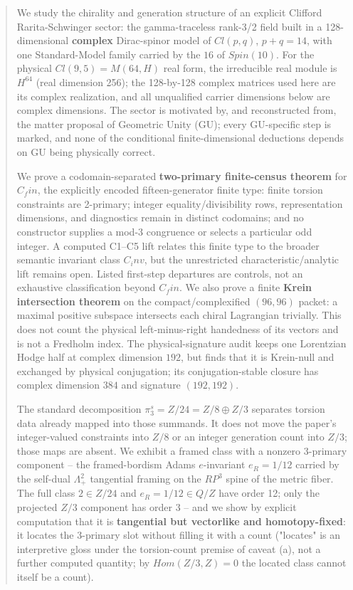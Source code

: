 \documentclass[11pt]{article}
\theoremstyle{remark}
\begin{document}
\begin{abstract}
We study the chirality and generation structure of an explicit Clifford Rarita-Schwinger sector: the gamma-traceless rank-3/2 field built in a 128-dimensional \textbf{complex} Dirac-spinor model of $Cl(p,q)$, $p+q = 14$, with one Standard-Model family carried by the $16$ of $Spin(10)$. For the physical $Cl(9,5) = M(64,H)$ real form, the irreducible real module is $H^64$ (real dimension 256); the 128-by-128 complex matrices used here are its complex realization, and all unqualified carrier dimensions below are complex dimensions. The sector is motivated by, and reconstructed from, the matter proposal of Geometric Unity (GU); every GU-specific step is marked, and none of the conditional finite-dimensional deductions depends on GU being physically correct.

We prove a codomain-separated \textbf{two-primary finite-census theorem} for $C_fin$, the explicitly encoded fifteen-generator finite type: finite torsion constraints are 2-primary; integer equality/divisibility rows, representation dimensions, and diagnostics remain in distinct codomains; and no constructor supplies a mod-3 congruence or selects a particular odd integer. A computed C1--C5 lift relates this finite type to the broader semantic invariant class $C_inv$, but the unrestricted characteristic/analytic lift remains open. Listed first-step departures are controls, not an exhaustive classification beyond $C_fin$. We also prove a finite \textbf{Krein intersection theorem} on the compact/complexified $(96,96)$ packet: a maximal positive subspace intersects each chiral Lagrangian trivially. This does not count the physical left-minus-right handedness of its vectors and is not a Fredholm index. The physical-signature audit keeps one Lorentzian Hodge half at complex dimension $192$, but finds that it is Krein-null and exchanged by physical conjugation; its conjugation-stable closure has complex dimension $384$ and signature $(192,192)$.

The standard decomposition $\pi_3^s = Z/24 = Z/8 \oplus Z/3$ separates torsion data already mapped into those summands. It does not move the paper's integer-valued constraints into $Z/8$ or an integer generation count into $Z/3$; those maps are absent. We exhibit a framed class with a nonzero 3-primary component -- the framed-bordism Adams $e$-invariant $e_R = 1/12$ carried by the self-dual $\Lambda^2_+$ tangential framing on the $RP^3$ spine of the metric fiber. The full class $2 \in Z/24$ and $e_R = 1/12 \in Q/Z$ have order 12; only the projected $Z/3$ component has order 3 -- and we show by explicit computation that it is \textbf{tangential but vectorlike and homotopy-fixed}: it locates the 3-primary slot without filling it with a count ("locates" is an interpretive gloss under the torsion-count premise of caveat (a), not a further computed quantity; by $Hom(Z/3, Z) = 0$ the located class cannot itself be a count).


\end{abstract}
\end{document}
